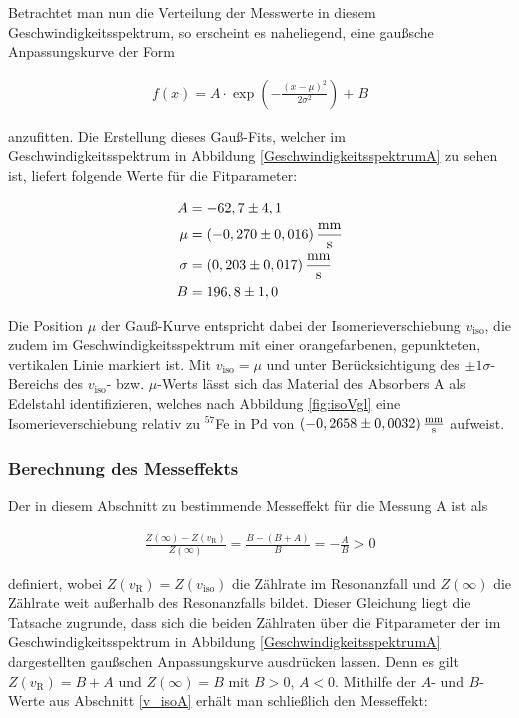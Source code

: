 \documentclass[
a4paper,                %
titlepage=firstiscover, %
captions=tableheading,  %
toc=bibliography,       %
toc=listof,             %
oneside,                %
automark,               %
12pt,                   %
english, ngerman,       %
parskip = half,         %
]{scrartcl}
\begin{document}
\noindent Betrachtet man nun die Verteilung der Messwerte in diesem Geschwindigkeitsspektrum, so erscheint es naheliegend, eine gaußsche Anpassungskurve der Form

\begin{align}
f(x)=A\cdot\exp\left( -\frac{(x-\mu)^2}{2\sigma ^2}\right) +B
\end{align}

\noindent anzufitten.
Die Erstellung dieses Gauß-Fits, welcher im Geschwindigkeitsspektrum in Abbildung \ref{GeschwindigkeitsspektrumA} zu sehen ist, liefert folgende Werte für die Fitparameter:

\begin{align*}
A &= -62,7\pm 4,1 \\
\mu &=  (-0,270\pm 0,016)\,\frac{\textnormal{mm}}{\textnormal{s}} \\
\sigma &= (0,203\pm 0,017)\,\frac{\textnormal{mm}}{\textnormal{s}} \\
B &= 196,8\pm 1,0
\end{align*}

\noindent Die Position $\mu$ der Gauß-Kurve entspricht dabei der Isomerieverschiebung $v_\text{iso}$, die zudem im Geschwindigkeitsspektrum mit einer orangefarbenen, gepunkteten, vertikalen Linie markiert ist.
Mit $v_\text{iso} = \mu$ und unter Berücksichtigung des $\pm 1\sigma$-Bereichs des $v_\text{iso}$- bzw. $\mu$-Werts lässt sich das Material des Absorbers A als Edelstahl identifizieren, welches nach Abbildung \ref{fig:isoVgl} eine Isomerieverschiebung relativ zu $^{57}$Fe in Pd von $(-0,2658\pm 0,0032)\,\frac{\textnormal{mm}}{\textnormal{s}}$ aufweist.


\subsubsection{Berechnung des Messeffekts}

Der in diesem Abschnitt zu bestimmende Messeffekt für die Messung A ist als

\begin{align}
\frac{Z(\infty)-Z(v_\text{R})}{Z(\infty)}=\frac{B-(B+A)}{B}=-\frac{A}{B}>0
\end{align}

\noindent definiert, wobei $Z(v_\text{R})=Z(v_\text{iso})$ die Zählrate im Resonanzfall und $Z(\infty)$ die Zählrate weit außerhalb des Resonanzfalls bildet.
Dieser Gleichung liegt die Tatsache zugrunde, dass sich die beiden Zählraten über die Fitparameter der im Geschwindigkeitsspektrum in Abbildung \ref{GeschwindigkeitsspektrumA} dargestellten gaußschen Anpassungskurve ausdrücken lassen.
Denn es gilt $Z(v_\text{R})=B+A$ und $Z(\infty)=B$ mit $B>0$, $A<0$.
Mithilfe der $A$- und $B$-Werte aus Abschnitt \ref{v_isoA} erhält man schließlich den Messeffekt:
\end{document}
